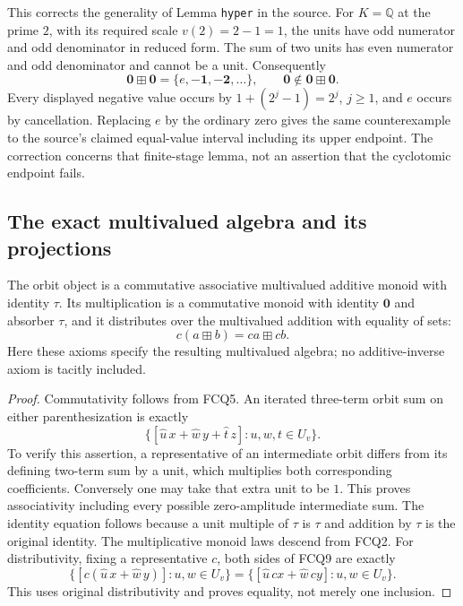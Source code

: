 This corrects the generality of Lemma \texttt{hyper} in the
source. For $K=\mathbb Q$ at the prime $2$, with its required
scale $v(2)=2-1=1$, the units have odd numerator and odd
denominator in reduced form. The sum of two units has even
numerator and odd denominator and cannot be a unit.
Consequently
\begin{equation}\tag{FCQ8}
\mathbf0\boxplus\mathbf0
 =\{e,\mathbf{-1},\mathbf{-2},\ldots\},
 \qquad
\mathbf0\notin\mathbf0\boxplus\mathbf0.
\end{equation}
Every displayed negative value occurs by
$1+(2^j-1)=2^j$, $j\ge1$, and $e$ occurs by cancellation.
Replacing $e$ by the ordinary zero gives the same counterexample
to the source's claimed equal-value interval including its
upper endpoint. The correction concerns that finite-stage
lemma, not an assertion that the cyclotomic endpoint fails.

\subsection{The exact multivalued algebra and its projections}

The orbit object is a commutative associative multivalued
additive monoid with identity $\tau$. Its multiplication is
a commutative monoid with identity $\mathbf0$ and absorber
$\tau$, and it distributes over the multivalued addition
with equality of sets:
\begin{equation}\tag{FCQ9}
c(a\boxplus b)=ca\boxplus cb.
\end{equation}
Here these axioms specify the resulting multivalued algebra;
no additive-inverse axiom is tacitly included.

\begin{proof}
Commutativity follows from FCQ5. An iterated three-term orbit
sum on either parenthesization is exactly
\[
\{[\widehat u\,x+\widehat w\,y+\widehat t\,z]:
                      u,w,t\in U_v\}.
\]
To verify this assertion, a representative of an intermediate
orbit differs from its defining two-term sum by a unit, which
multiplies both corresponding coefficients. Conversely one
may take that extra unit to be $1$. This proves associativity
including every possible zero-amplitude intermediate sum.
The identity equation follows because a unit multiple of
$\tau$ is $\tau$ and addition by $\tau$ is the original identity.
The multiplicative monoid laws descend from FCQ2. For
distributivity, fixing a representative $c$, both sides of
FCQ9 are exactly
\[
\{[c(\widehat u\,x+\widehat w\,y)]:u,w\in U_v\}
 =\{[\widehat u\,cx+\widehat w\,cy]:u,w\in U_v\}.
\]
This uses original distributivity and proves equality, not
merely one inclusion.
\end{proof}

